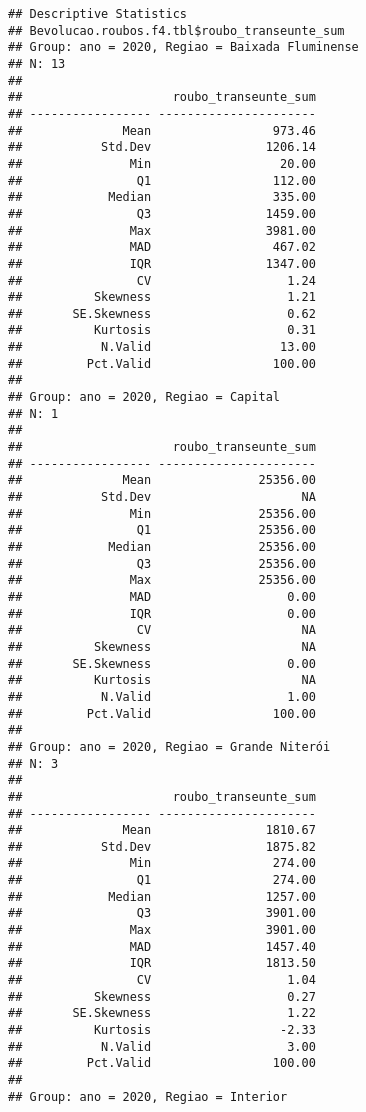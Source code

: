 \documentclass[
]{article}
\begin{document}
\begin{verbatim}
## Descriptive Statistics  
## Bevolucao.roubos.f4.tbl$roubo_transeunte_sum  
## Group: ano = 2020, Regiao = Baixada Fluminense  
## N: 13  
## 
##                     roubo_transeunte_sum
## ----------------- ----------------------
##              Mean                 973.46
##           Std.Dev                1206.14
##               Min                  20.00
##                Q1                 112.00
##            Median                 335.00
##                Q3                1459.00
##               Max                3981.00
##               MAD                 467.02
##               IQR                1347.00
##                CV                   1.24
##          Skewness                   1.21
##       SE.Skewness                   0.62
##          Kurtosis                   0.31
##           N.Valid                  13.00
##         Pct.Valid                 100.00
## 
## Group: ano = 2020, Regiao = Capital  
## N: 1  
## 
##                     roubo_transeunte_sum
## ----------------- ----------------------
##              Mean               25356.00
##           Std.Dev                     NA
##               Min               25356.00
##                Q1               25356.00
##            Median               25356.00
##                Q3               25356.00
##               Max               25356.00
##               MAD                   0.00
##               IQR                   0.00
##                CV                     NA
##          Skewness                     NA
##       SE.Skewness                   0.00
##          Kurtosis                     NA
##           N.Valid                   1.00
##         Pct.Valid                 100.00
## 
## Group: ano = 2020, Regiao = Grande Niterói  
## N: 3  
## 
##                     roubo_transeunte_sum
## ----------------- ----------------------
##              Mean                1810.67
##           Std.Dev                1875.82
##               Min                 274.00
##                Q1                 274.00
##            Median                1257.00
##                Q3                3901.00
##               Max                3901.00
##               MAD                1457.40
##               IQR                1813.50
##                CV                   1.04
##          Skewness                   0.27
##       SE.Skewness                   1.22
##          Kurtosis                  -2.33
##           N.Valid                   3.00
##         Pct.Valid                 100.00
## 
## Group: ano = 2020, Regiao = Interior  

\end{verbatim}
\end{document}
